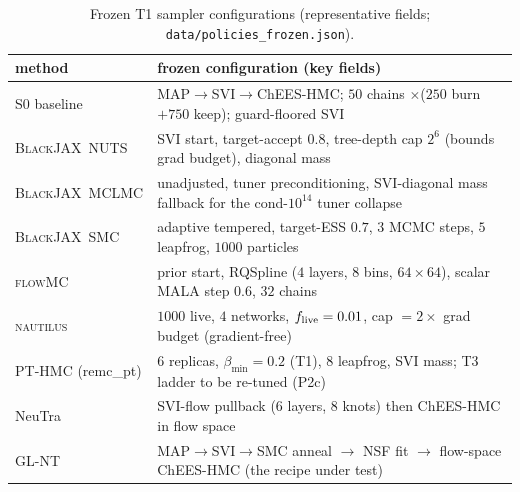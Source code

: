 \documentclass[11pt,letterpaper]{article}
\newcommand{\nautilus}{\textsc{nautilus}}
\newcommand{\flowmc}{\textsc{flowMC}}
\newcommand{\blackjax}{\textsc{BlackJAX}}
\newcommand{\dfile}[1]{\texttt{#1}}
\begin{document}
\begin{table}[ht]
\centering
\caption{Frozen T1 sampler configurations (representative fields;
\dfile{data/policies\_frozen.json}).}
\label{tab:configs}
\small
\begin{tabular}{lp{}}
\toprule
method & frozen configuration (key fields) \\
\midrule
S0 baseline & MAP$\to$SVI$\to$ChEES-HMC; $50$ chains $\times$($250$ burn $+750$ keep); guard-floored SVI \\
\blackjax\ NUTS & SVI start, target-accept $0.8$, tree-depth cap $2^6$ (bounds grad budget), diagonal mass \\
\blackjax\ MCLMC & unadjusted, tuner preconditioning, SVI-diagonal mass fallback for the cond-$10^{14}$ tuner collapse \\
\blackjax\ SMC & adaptive tempered, target-ESS $0.7$, $3$ MCMC steps, $5$ leapfrog, $1000$ particles \\
\flowmc & prior start, RQSpline ($4$ layers, $8$ bins, $64{\times}64$), scalar MALA step $0.6$, $32$ chains \\
\nautilus & $1000$ live, $4$ networks, $f_{\rm live}=0.01$, cap $=2\times$ grad budget (gradient-free) \\
PT-HMC (remc\_pt) & $6$ replicas, $\beta_{\min}=0.2$ (T1), $8$ leapfrog, SVI mass; T3 ladder to be re-tuned (P2c) \\
NeuTra & SVI-flow pullback ($6$ layers, $8$ knots) then ChEES-HMC in flow space \\
GL-NT & MAP$\to$SVI$\to$SMC anneal $\to$ NSF fit $\to$ flow-space ChEES-HMC (the recipe under test) \\
\bottomrule
\end{tabular}
\end{table}



\end{document}
